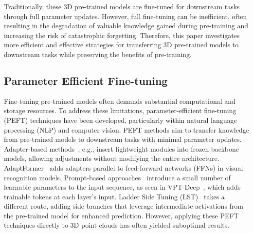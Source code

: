 
Traditionally, these 3D pre-trained models are fine-tuned for downstream tasks through full parameter updates. However, full fine-tuning can be inefficient, often resulting in the degradation of valuable knowledge gained during pre-training and increasing the risk of catastrophic forgetting. Therefore, this paper investigates more efficient and effective strategies for transferring 3D pre-trained models to downstream tasks while preserving the benefits of pre-training.

\subsection{Parameter Efficient Fine-tuning}
Fine-tuning pre-trained models often demands substantial computational and storage resources. To address these limitations, parameter-efficient fine-tuning (PEFT) techniques have been developed, particularly within natural language processing (NLP) and computer vision. PEFT methods aim to transfer knowledge from pre-trained models to downstream tasks with minimal parameter updates. 
Adapter-based methods~\cite{houlsby2019parameter, hu2021lora, chen2022adaptformer}, e.g., insert lightweight modules into frozen backbone models, allowing adjustments without modifying the entire architecture. AdaptFormer~\cite{chen2022adaptformer} adds adapters parallel to feed-forward networks (FFNs) in visual recognition models. 
Prompt-based approaches~\cite{li2021prefix, jia2022visual} introduce a small number of learnable parameters to the input sequence, as seen in VPT-Deep~\cite{jia2022visual}, which adds trainable tokens at each layer’s input. 
Ladder Side Tuning (LST)~\cite{sung2022lst} takes a different route, adding side branches that leverage intermediate activations from the pre-trained model for enhanced prediction. However, applying these PEFT techniques directly to 3D point clouds has often yielded suboptimal results.

